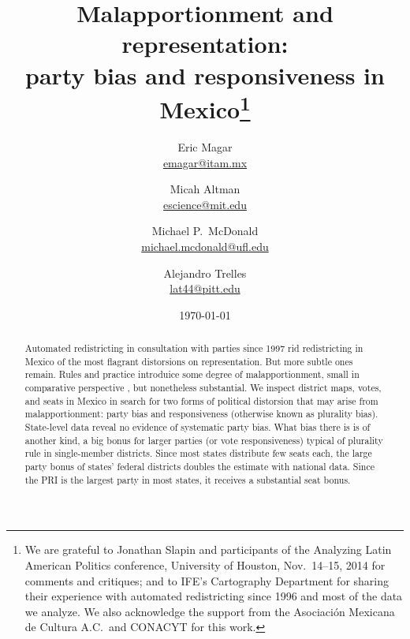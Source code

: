 \documentclass[letter,12pt]{article}
\begin{document}
\title{Malapportionment and representation: \\ party bias and responsiveness in Mexico\thanks{We are grateful to Jonathan Slapin and participants of the Analyzing Latin American Politics conference, University of Houston, Nov.~14--15, 2014 for comments and critiques; and to IFE's Cartography Department for sharing their experience with automated redistricting since 1996 and most of the data we analyze. We also acknowledge the support from the Asociaci\'on Mexicana de Cultura A.C.\ and CONACYT for this work.}}
\author{Eric Magar \\ {\footnotesize \url{emagar@itam.mx}} \and
        Micah Altman \\ {\footnotesize \url{escience@mit.edu}} \and
        Michael P.~McDonald \\ {\footnotesize \url{michael.mcdonald@ufl.edu}} \and  %
        Alejandro Trelles \\ {\footnotesize \url{lat44@pitt.edu}}
      }
\date{\today}
\maketitle

\begin{abstract}
\noindent Automated redistricting in consultation with parties since 1997 rid redistricting in Mexico of the most flagrant distorsions on representation. But more subtle ones remain. Rules and practice introduice some degree of malapportionment, small in comparative perspective \citep{samuels.snyder.2001}, but nonetheless substantial. We inspect district maps, votes, and seats in Mexico in search for two forms of political distorsion that may arise from malapportionment: party bias and responsiveness (otherwise known as plurality bias). State-level data reveal no evidence of systematic party bias. What bias there is is of another kind, a big bonus for larger parties (or vote responsiveness) typical of plurality rule in single-member districts. Since most states distribute few seats each, the large party bonus of states' federal districts doubles the estimate with national data. Since the PRI is the largest party in most states, it receives a substantial seat bonus.
\end{abstract}
\end{document}
